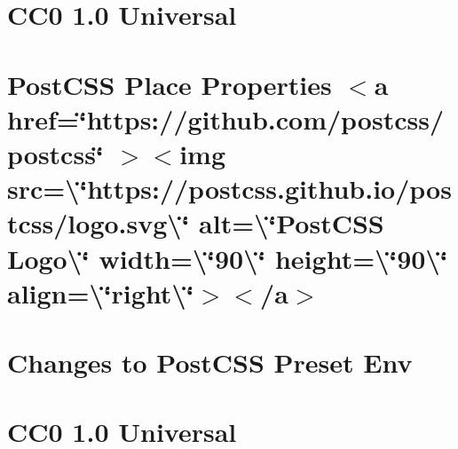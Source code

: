 \documentclass[twoside]{book}
\newcommand{\+}{\discretionary{\mbox{\scriptsize$\hookleftarrow$}}{}{}}
\begin{document}
\chapter{CC0 1.0 Universal}
\label{md__c___users_vaishnavi_jadhav__desktop__developer_code_mean_stack_example_client_node_modules_postcss_place__l_i_c_e_n_s_e}

\chapter{Post\+CSS Place Properties \texorpdfstring{$<$}{<}a href=\char`\"{}https\+://github.\+com/postcss/postcss\char`\"{} \texorpdfstring{$>$}{>}\texorpdfstring{$<$}{<}img src=\textbackslash{}\char`\"{}https\+://postcss.\+github.\+io/postcss/logo.\+svg\textbackslash{}\char`\"{} alt=\textbackslash{}\char`\"{}\+Post\+CSS Logo\textbackslash{}\char`\"{} width=\textbackslash{}\char`\"{}90\textbackslash{}\char`\"{} height=\textbackslash{}\char`\"{}90\textbackslash{}\char`\"{} align=\textbackslash{}\char`\"{}right\textbackslash{}\char`\"{}\texorpdfstring{$>$}{>}\texorpdfstring{$<$}{<}/a\texorpdfstring{$>$}{>}}
\label{md__c___users_vaishnavi_jadhav__desktop__developer_code_mean_stack_example_client_node_modules_postcss_place__r_e_a_d_m_e}

\chapter{Changes to Post\+CSS Preset Env}
\label{md__c___users_vaishnavi_jadhav__desktop__developer_code_mean_stack_example_client_node_modules_pad5b94de6589372bf415606e37d6e3ac}

\chapter{CC0 1.0 Universal}
\label{md__c___users_vaishnavi_jadhav__desktop__developer_code_mean_stack_example_client_node_modules_p5dfef8cd5d6b78a8d527eb1bbec6ca9e}

\end{document}
